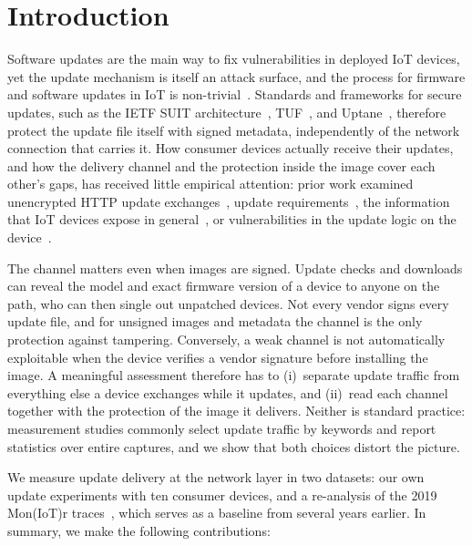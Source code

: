 
\section{Introduction}

Software updates are the main way to fix vulnerabilities in deployed IoT devices, yet the update mechanism is itself an attack surface, and the process for firmware and software updates in IoT is non-trivial~\cite{294541,10710264}.
Standards and frameworks for secure updates, such as the IETF SUIT architecture~\cite{rfc9019,rfc9124}, TUF~\cite{samuel2010tuf}, and Uptane~\cite{kuppusamy2016uptane}, therefore protect the update file itself with signed metadata, independently of the network connection that carries it.
How consumer devices actually receive their updates, and how the delivery channel and the protection inside the image cover each other's gaps, has received little empirical attention: prior work examined unencrypted HTTP update exchanges~\cite{10.1007/978-3-031-30122-3_25,10.1145/3560835.3564551}, update requirements~\cite{icissp23}, the information that IoT devices expose in general~\cite{10.1145/3355369.3355577}, or vulnerabilities in the update logic on the device~\cite{294541,USMAN2026105019}.

The channel matters even when images are signed.
Update checks and downloads can reveal the model and exact firmware version of a device to anyone on the path, who can then single out unpatched devices.
Not every vendor signs every update file, and for unsigned images and metadata the channel is the only protection against tampering.
Conversely, a weak channel is not automatically exploitable when the device verifies a vendor signature before installing the image.
A meaningful assessment therefore has to (i)~separate update traffic from everything else a device exchanges while it updates, and (ii)~read each channel together with the protection of the image it delivers.
Neither is standard practice: measurement studies commonly select update traffic by keywords and report statistics over entire captures, and we show that both choices distort the picture.

We measure update delivery at the network layer in two datasets: our own update experiments with ten consumer devices, and a re-analysis of the 2019 Mon(IoT)r traces~\cite{10.1145/3355369.3355577}, which serves as a baseline from several years earlier.
In summary, we make the following contributions:

